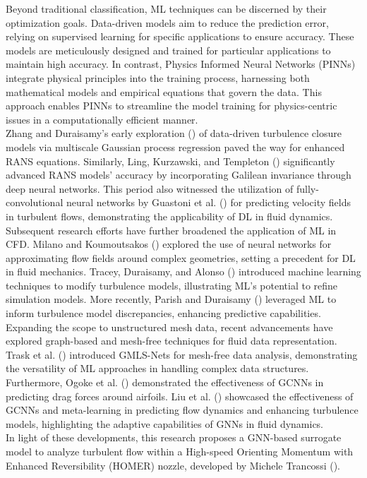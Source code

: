Beyond traditional classification, ML techniques can be discerned by their optimization goals. Data-driven models aim to reduce the prediction error, relying on supervised learning for specific applications to ensure accuracy. These models are meticulously designed and trained for particular applications to maintain high accuracy. In contrast, Physics Informed Neural Networks (PINNs) integrate physical principles into the training process, harnessing both mathematical models and empirical equations that govern the data. This approach enables PINNs to streamline the model training for physics-centric issues in a computationally efficient manner. \\
Zhang and Duraisamy’s early exploration (\cite{zhang2015}) of data-driven turbulence closure models via multiscale Gaussian process regression paved the way for enhanced RANS equations. Similarly, Ling, Kurzawski, and Templeton (\cite{ling2016}) significantly advanced RANS models' accuracy by incorporating Galilean invariance through deep neural networks. This period also witnessed the utilization of fully-convolutional neural networks by Guastoni et al. (\cite{guastoni2020}) for predicting velocity fields in turbulent flows, demonstrating the applicability of DL in fluid dynamics.\\
Subsequent research efforts have further broadened the application of ML in CFD. Milano and Koumoutsakos (\cite{milano2002}) explored the use of neural networks for approximating flow fields around complex geometries, setting a precedent for DL in fluid mechanics. Tracey, Duraisamy, and Alonso (\cite{tracey2013}) introduced machine learning techniques to modify turbulence models, illustrating ML's potential to refine simulation models. More recently, Parish and Duraisamy (\cite{parish2016}) leveraged ML to inform turbulence model discrepancies, enhancing predictive capabilities.\\
Expanding the scope to unstructured mesh data, recent advancements have explored graph-based and mesh-free techniques for fluid data representation. Trask et al. (\cite{trask2019}) introduced GMLS-Nets for mesh-free data analysis, demonstrating the versatility of ML approaches in handling complex data structures. Furthermore, Ogoke et al. (\cite{ogoke2020}) demonstrated the effectiveness of GCNNs in predicting drag forces around airfoils. Liu et al. (\cite{metalearning}) showcased the effectiveness of GCNNs and meta-learning in predicting flow dynamics and enhancing turbulence models, highlighting the adaptive capabilities of GNNs in fluid dynamics.\\
In light of these developments, this research proposes a GNN-based surrogate model to analyze turbulent flow within a High-speed Orienting Momentum with Enhanced Reversibility (HOMER) nozzle, developed by Michele Trancossi (\cite{trandum}).

